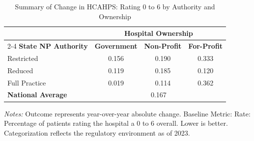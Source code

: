 \begin{table}[htbp]
    \centering
    \caption{Summary of Change in HCAHPS: Rating 0 to 6 by Authority and Ownership}
    \label{tab:d_h_hosp_rating_0_6_own}
    \vspace{0.2cm}
    \begin{tabular}{lccc}
        \toprule
        & \multicolumn{3}{c}{\textbf{Hospital Ownership}} \\
        \cmidrule(lr){2-4}
        \textbf{State NP Authority} & \textbf{Government} & \textbf{Non-Profit} & \textbf{For-Profit} \\
        \midrule
        Restricted & 0.156 & 0.190 & 0.333 \\
        Reduced & 0.119 & 0.185 & 0.120 \\
        Full Practice & 0.019 & 0.114 & 0.362 \\
        \midrule
        \textbf{National Average} & \multicolumn{3}{c}{0.167} \\
        \bottomrule
    \end{tabular}
    \vspace{0.1cm}
    \begin{minipage}{0.85\textwidth}
        \footnotesize \textit{Notes:} Outcome represents year-over-year absolute change. Baseline Metric: Rate: Percentage of patients rating the hospital a 0 to 6 overall. Lower is better. Categorization reflects the regulatory environment as of 2023.
    \end{minipage}
\end{table}